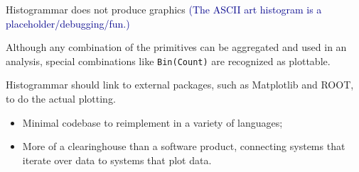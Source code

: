 \documentclass{beamer}
\begin{document}
\begin{frame}{Histogrammar does not produce graphics}
\textcolor{darkblue}{\large (The ASCII art histogram is a placeholder/debugging/fun.)}

\vfill
Although any combination of the primitives can be aggregated and used in an analysis, special combinations like {\tt Bin(Count)} are recognized as plottable.

\vfill
Histogrammar should link to external packages, such as Matplotlib and ROOT, to do the actual plotting.
\begin{itemize}
\item Minimal codebase to reimplement in a variety of languages;
\item More of a clearinghouse than a software product, connecting systems that iterate over data to systems that plot data.
\end{itemize}
\end{frame}
\end{document}
